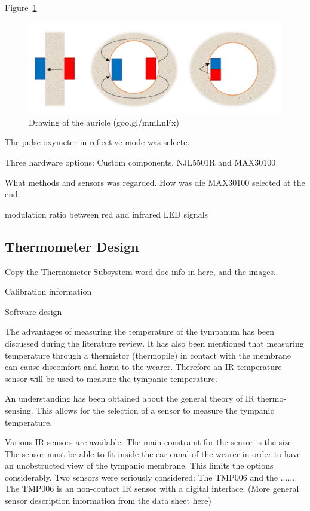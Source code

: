 Figure~\ref{fig:PulseOxiConfiguration}

\begin{figure}
   \centering
   \includegraphics[scale=0.6]{figs/PulseOxiConfiguration}
   \caption{Drawing of the auricle (goo.gl/mmLnFx)}
   \label{fig:PulseOxiConfiguration}
\end{figure}

The pulse oxymeter in reflective mode was selecte.

Three hardware options: Custom components, NJL5501R and MAX30100

What methods and sensors was regarded. How was die MAX30100 selected at the end.



modulation ratio between red and infrared LED signals


\subsection{Thermometer Design}

Copy the Thermometer Subsystem word doc info in here, and the images.

Calibration information

Software design

The advantages of measuring the temperature of the tympanum has been discussed during the literature review. It has also been mentioned that measuring temperature through a thermistor (thermopile) in contact with the membrane can cause discomfort and harm to the wearer. Therefore an IR temperature sensor will be used to measure the tympanic temperature.

An understanding has been obtained about the general theory of IR thermo-sensing. This allows for the selection of a sensor to measure the tympanic temperature.

Various IR sensors are available. The main constraint for the sensor is the size. The sensor must be able to fit inside the ear canal of the wearer in order to have an unobstructed view of the tympanic membrane. This limits the options considerably. Two sensors were seriously considered: The TMP006 and the ...... The TMP006 is an non-contact IR sensor with a digital interface. (More general sensor description information from the data sheet here)

